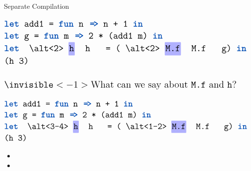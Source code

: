 \begin{frame}

  \huge Separate Compilation

\end{frame}

\begin{frame}

  \[
  \Large
  \begin{array}{@{}ll@{}}
    \mex{\kw{let} add1 = \kw{fun} n \codearr n + 1 \kw{in}} \\
    \mex{\kw{let} g = \kw{fun} m \codearr 2 * (add1 m) \kw{in}} \\
    \mex{\kw{let} \altcolor{2}{blue}{h} = (\altcolor{2}{blue}{M.f} g) \kw{in}} \\
    \mex{(h 3)} \\
    \\
    \invisible<-1>{\text{What can we say about \mex{M.f} and \mex{h}?}}
  \end{array}
  \]


\end{frame}

\begin{frame}

  \Large
  \[
  \Large
  \begin{array}{@{}ll@{}}
    \mex{\kw{let} add1 = \kw{fun} n \codearr n + 1 \kw{in}} \\
    \mex{\kw{let} g = \kw{fun} m \codearr 2 * (add1 m) \kw{in}} \\
    \mex{\kw{let} \altcolor{3-4}{blue}{h} = (\altcolor{1-2}{blue}{M.f} g) \kw{in}} \\
    \mex{(h 3)}
  \end{array}
  \]

  \begin{itemize}
  \item {}
  \item {}
  \end{itemize}




\end{frame}

